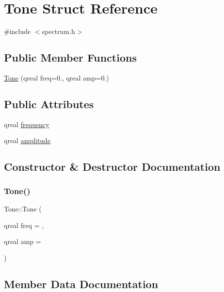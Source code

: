 \hypertarget{struct_tone}{}\section{Tone Struct Reference}
\label{struct_tone}


{\ttfamily \#include $<$spectrum.\+h$>$}

\subsection*{Public Member Functions}
\begin{DoxyCompactItemize}
\item 
\hyperlink{struct_tone_a519be8e3fb9fd042aa3980006c888b4b}{Tone} (qreal freq=0., qreal amp=0.)
\end{DoxyCompactItemize}
\subsection*{Public Attributes}
\begin{DoxyCompactItemize}
\item 
qreal \hyperlink{struct_tone_af9f6f7f70cd653e3a4033d1d9bb51657}{frequency}
\item 
qreal \hyperlink{struct_tone_a1652dad40126318d5bb4919c405a3a93}{amplitude}
\end{DoxyCompactItemize}


\subsection{Constructor \& Destructor Documentation}
\hypertarget{struct_tone_a519be8e3fb9fd042aa3980006c888b4b}{}\label{struct_tone_a519be8e3fb9fd042aa3980006c888b4b} 
\subsubsection{\texorpdfstring{Tone()}{Tone()}}
{\footnotesize\ttfamily Tone\+::\+Tone (\begin{DoxyParamCaption}\item[{qreal}]{freq = {},  }\item[{qreal}]{amp = {} }\end{DoxyParamCaption})\hspace{0.3cm}{\ttfamily [inline]}}



\subsection{Member Data Documentation}
\hypertarget{struct_tone_a1652dad40126318d5bb4919c405a3a93}{}\label{struct_tone_a1652dad40126318d5bb4919c405a3a93} 
